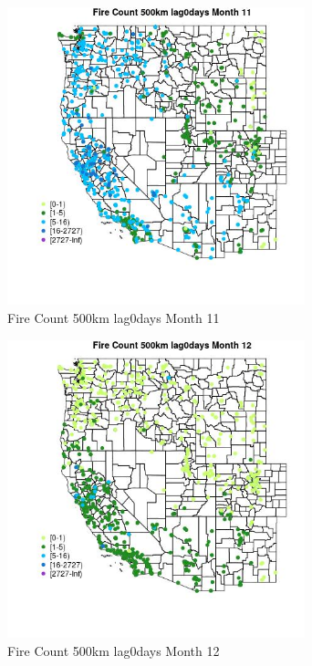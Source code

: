 \begin{figure} 
\centering  
\includegraphics[width=0.77\textwidth]{Code_Outputs/Report_ML_input_PM25_Step4_part_f_de_duplicated_aves_prioritize_24hr_obswNAs_MapObsMo11Fire_Count_500km_lag0days.jpg} 
\caption{\label{fig:Report_ML_input_PM25_Step4_part_f_de_duplicated_aves_prioritize_24hr_obswNAsMapObsMo11Fire_Count_500km_lag0days}Fire Count 500km lag0days Month 11} 
\end{figure} 
 

\clearpage 

\begin{figure} 
\centering  
\includegraphics[width=0.77\textwidth]{Code_Outputs/Report_ML_input_PM25_Step4_part_f_de_duplicated_aves_prioritize_24hr_obswNAs_MapObsMo12Fire_Count_500km_lag0days.jpg} 
\caption{\label{fig:Report_ML_input_PM25_Step4_part_f_de_duplicated_aves_prioritize_24hr_obswNAsMapObsMo12Fire_Count_500km_lag0days}Fire Count 500km lag0days Month 12} 
\end{figure} 
 

